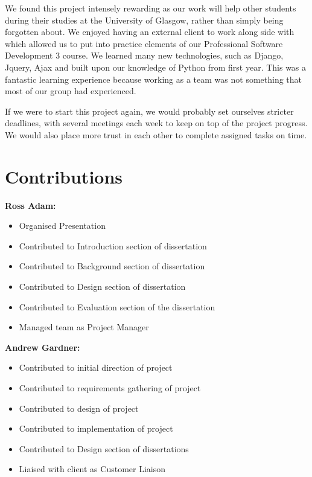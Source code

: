 \documentclass{l3proj}
\begin{document}
We found this project intensely rewarding as our work will help other students during their studies at the University of Glasgow, rather than simply being forgotten about. We enjoyed having an external client to work along side with which allowed us to put into practice elements of our Professional Software Development 3 course. We learned many new technologies, such as Django, Jquery, Ajax and built upon our knowledge of Python from first year. This was a fantastic learning experience because working as a team was not something that most of our group had experienced.

If we were to start this project again, we would probably set ourselves stricter deadlines, with several meetings each week to keep on top of the project progress. We would also place more trust in each other to complete assigned tasks on time.

\section{Contributions}

\textbf{Ross Adam:}

\begin{itemize}
\item Organised Presentation
\item Contributed to Introduction section of dissertation
\item Contributed to Background section of dissertation
\item Contributed to Design section of dissertation
\item Contributed to Evaluation section of the dissertation
\item Managed team as Project Manager
\end{itemize}

\textbf{Andrew Gardner:}

\begin{itemize}
\item Contributed to initial direction of project 
\item Contributed to requirements gathering of project
\item Contributed to design of project
\item Contributed to implementation of project
\item Contributed to Design section of dissertations
\item Liaised with client as Customer Liaison
\end{itemize}
\end{document}
